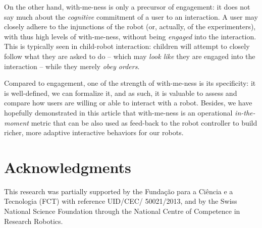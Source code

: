 \documentclass{sig-alternate}
\begin{document}
On the other hand, with-me-ness is only a precursor of engagement: it
does not say much about the \emph{cognitive} commitment of a user to an interaction. A
user may closely adhere to the injunctions of the robot (or, actually, of the
experimenters), with thus high levels of with-me-ness,  without being \emph{engaged} into the interaction. This is
typically seen in child-robot interaction: children will attempt to closely
follow what they are asked to do -- which may \emph{look like} they are engaged
into the interaction -- while they merely \emph{obey orders}.

Compared to engagement, one of the strength of with-me-ness is its specificity:
it is well-defined, we can formalize it, and
as such, it is valuable to assess and compare how users are willing or able to
interact with a robot. Besides, we have hopefully demonstrated in this article
that with-me-ness is an operational \emph{in-the-moment} metric that can be also
used as feed-back to the robot controller to build richer, more adaptive
interactive behaviors for our robots.

\section*{Acknowledgments}

This research was partially supported by the Funda\c{c}\~{a}o para a Ci\^{e}ncia
e a Tecnologia (FCT) with reference UID/CEC/ 50021/2013, and by the Swiss
National Science Foundation through the National Centre of Competence in
Research Robotics.



\end{document}
